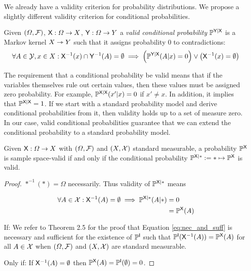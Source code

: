 We already have a validity criterion for probability distributions. We propose a slightly different validity criterion for conditional probabilities.

\begin{definition}\label{def:valid_conditional_prob}
Given $(\Omega,\mathcal{F})$, $\mathsf{X}:\Omega\to X$, $\mathsf{Y}:\Omega\to Y$ a \emph{valid conditional probability} $\mathbb{P}^{\mathsf{Y}|\mathsf{X}}$ is a Markov kernel $X\rightarrowtriangle Y$ such that it assigns probability 0 to contradictions:
\begin{align}
	\forall A\in \mathcal{Y}, x\in X: \mathsf{X}^{-1}(x)\cap \mathsf{Y}^{-1}(A) = \emptyset \implies \left(\mathbb{P}^{\mathsf{Y}|\mathsf{X}}(A|x) = 0\right) \lor \left(\mathsf{X}^{-1}(x) = \emptyset\right)
\end{align}
\end{definition}

The requirement that a conditional probability be valid means that if the variables themselves rule out certain values, then these values must be assigned zero probability. For example, $\mathbb{P}^{\mathsf{X}|\mathsf{X}}(x'|x)=0$ if $x'\neq x$. In addition, it implies that $\mathbb{P}^{\mathsf{X}|\mathsf{X}}=1$. If we start with a standard probability model and derive conditional probabilities from it, then validity holds up to a set of measure zero. In our case, valid conditional probabilities guarantee that we can extend the conditional probability to a standard probability model.

\begin{theorem}\label{th:valid_agree}
Given $\mathsf{X}:\Omega\to X$ with $(\Omega,\mathcal{F})$ and $(X,\mathcal{X})$ standard measurable, a probability $\mathbb{P}^{\mathsf{X}}$ is sample space-valid if and only if the conditional probability $\mathbb{P}^{\mathsf{X}|*}:=*\mapsto \mathbb{P}^{\mathsf{X}}$ is valid.
\end{theorem}

\begin{proof}
$*^{-1}(*)=\Omega$ necessarily. Thus validity of $\mathbb{P}^{\mathsf{X}|*}$ means 

\begin{align}
	\forall A\in \mathcal{X}: \mathsf{X}^{-1}(A)=\emptyset \implies \mathbb{P}^{\mathsf{X}|*}(A|*)&=0\\
	&= \mathbb{P}^{\mathsf{X}}(A)\label{eq:nec_and_suff}
\end{align}

If: We refer to \citet{ershov_extension_1975} Theorem 2.5 for the proof that Equation \ref{eq:nec_and_suff} is necessary and sufficient for the existence of $\mathbb{P}^{\mathsf{I}}$ such that $\mathbb{P}^{\mathsf{I}}(\mathsf{X}^{-1}(A))=\mathbb{P}^{\mathsf{X}}(A)$ for all $A\in \mathcal{X}$ when $(\Omega,\mathcal{F})$ and $(X,\mathcal{X})$ are standard measurable.

Only if: If $\mathsf{X}^{-1}(A)=\emptyset$ then $\mathbb{P}^{\mathsf{X}}(A)=\mathbb{P}^{\mathsf{I}}(\emptyset)=0$.
\end{proof}

